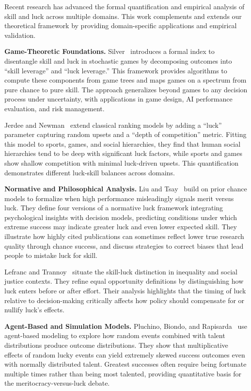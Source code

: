 Recent research has advanced the formal quantification and empirical analysis
of skill and luck across multiple domains. This work complements and
extends our theoretical framework by providing domain-specific
applications and empirical validation.

\textbf{Game-Theoretic Foundations.} Silver~\cite{silver2025} introduces
a formal index to disentangle skill and luck in stochastic games by decomposing
outcomes into ``skill leverage'' and ``luck leverage.'' This framework
provides algorithms to compute these components from game trees and maps
games on a spectrum from pure chance to pure skill. The approach generalizes
beyond games to any decision process under uncertainty, with
applications in game design, AI performance evaluation, and risk
management.

Jerdee and Newman~\cite{jerdee2024} extend classical ranking models by
adding a ``luck'' parameter capturing random upsets and a ``depth of
competition'' metric. Fitting this model to sports, games, and social hierarchies,
they find that human social hierarchies tend to be deep with significant
luck factors, while sports and games show shallow competition with minimal
luck-driven upsets. This quantification demonstrates different luck-skill
balances across domains.

\textbf{Normative and Philosophical Analysis.} Liu and Tsay~\cite{liu2023}
build on prior chance models to formalize when high performance misleadingly
signals merit versus luck. They define four versions of a normative luck
framework integrating psychological insights with decision models, predicting
conditions under which extreme success may indicate greater luck and even
lower expected skill. They illustrate how highly cited publications can
sometimes reflect lower true research quality through chance success, and
discuss strategies to correct biases that lead people to mistake luck for
skill.

Lefranc and Trannoy~\cite{lefranc2025} situate the skill-luck distinction
in inequality and social justice contexts. They refine equal opportunity
definitions by distinguishing how luck enters before or after effort. Their
analysis highlights that the timing of luck relative to decision-making critically
affects how policy should compensate for or nullify luck's effects.

\textbf{Agent-Based and Simulation Models.} Pluchino, Biondo, and
Rapisarda~\cite{pluchino2018} use agent-based modeling to explore how
random events combined with talent distributions produce outcome
distributions. They show that multiplicative effects of random lucky events
can yield extremely skewed success outcomes even with normally distributed
talent. Greatest successes often require being fortunate multiple times
rather than being most talented, providing quantitative basis for the meritocracy-versus-luck
debate.

